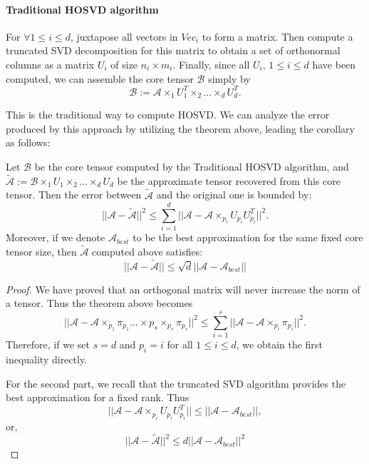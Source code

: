 \documentclass[12pt]{article}
\begin{document}
\paragraph{Traditional HOSVD algorithm} For $\forall 1 \leq i \leq d$, juxtapose all vectors in $Vec_i$ to form a matrix. Then compute a truncated SVD decomposition for this matrix to obtain a set of orthonormal columns as a matrix $U_i$ of size $n_i \times m_i$. Finally, since all $U_i$, $1 \leq i \leq d$ have been computed, we can assemble the core tensor $\mathcal{B}$ simply by 
$$ \mathcal{B} := \mathcal{A} \times_1 U_1^T \times_2 \dots \times_d U_d^T.$$

This is the traditional way to compute HOSVD. We can analyze the error produced by this approach by utilizing the theorem above, leading the corollary as follows:

\begin{mycor}
Let $\mathcal{B}$ be the core tensor computed by the Traditional HOSVD algorithm, and $\tilde{\mathcal{A}} := \mathcal{B} \times_1 U_1 \times_2 \dots \times_d U_d$ be the approximate tensor recovered from this core tensor. Then the error between $\tilde{\mathcal{A}}$ and the original one is bounded by:
$$|| \mathcal{A} - \tilde{\mathcal{A}} || ^ 2 \leq \sum_{i = 1}^d || \mathcal{A} - \mathcal{A} \times_{p_i} U_{p_i} U_{p_i}^T||^2. $$
Moreover, if we denote $\mathcal{A}_{best}$ to be the best approximation for the same fixed core tensor size, then $\tilde{\mathcal{A}}$ computed above satisfies:
$$ || \mathcal{A} - \tilde{\mathcal{A}} || \leq \sqrt{d} || \mathcal{A} - \mathcal{A}_{best}||$$
\end{mycor}

\begin{proof}
We have proved that an orthogonal matrix will never increase the norm of a tensor. Thus the theorem above becomes
$$|| \mathcal{A} - \mathcal{A} \times_{p_1} \pi_{p_1} \dots \times{p_s} \times_{p_s} \pi_{p_s}||^2 \leq \sum_{i = 1}^s || \mathcal{A} - \mathcal{A} \times_{p_i} \pi_{p_i}||^2.$$
Therefore, if we set $s = d$ and $p_i = i$ for all $1 \leq i \leq d$, we obtain the first inequality directly.

For the second part, we recall that the truncated SVD algorithm provides the best approximation for a fixed rank. Thus
$$ || \mathcal{A} - \mathcal{A} \times_{p_i} U_{p_i} U_{p_i}^T|| \leq || \mathcal{A} - \mathcal{A}_{best} ||, $$
or, $$|| \mathcal{A} - \tilde{\mathcal{A}} || ^ 2 \leq d || \mathcal{A} - \mathcal{A}_{best} || ^2$$
\end{proof}
\end{document}
